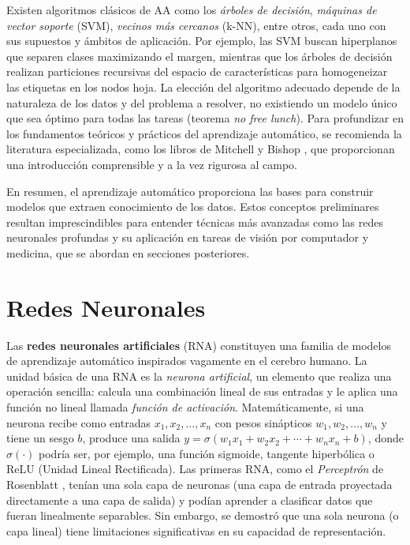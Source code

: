 \documentclass[11pt,spanish,listoffigures,listoftables]{tfgetsinf}
\begin{document}
Existen algoritmos clásicos de AA como los \textit{árboles de decisión}, \textit{máquinas de vector soporte} (SVM), \textit{vecinos más cercanos} (k-NN), entre otros,
cada uno con sus supuestos y ámbitos de aplicación. Por ejemplo, las SVM buscan hiperplanos que separen clases maximizando el margen, mientras que los árboles de 
decisión realizan particiones recursivas del espacio de características para homogeneizar las etiquetas en los nodos hoja. La elección del algoritmo adecuado depende 
de la naturaleza de los datos y del problema a resolver, no existiendo un modelo único que sea óptimo para todas las tareas (teorema \textit{no free lunch}). Para 
profundizar en los fundamentos teóricos y prácticos del aprendizaje automático, se recomienda la literatura especializada, como los libros de Mitchell \cite{Mitchell1997} 
y Bishop \cite{Bishop2006}, que proporcionan una introducción comprensible y a la vez rigurosa al campo.

En resumen, el aprendizaje automático proporciona las bases para construir modelos que extraen conocimiento de los datos. Estos conceptos preliminares resultan 
imprescindibles para entender técnicas más avanzadas como las redes neuronales profundas y su aplicación en tareas de visión por computador y medicina, que se 
abordan en secciones posteriores.

\section{Redes Neuronales}\label{sec:nn} 

Las \textbf{redes neuronales artificiales} (RNA) constituyen una familia de modelos de aprendizaje automático inspirados vagamente en el cerebro humano. 
La unidad básica de una RNA es la \textit{neurona artificial}, un elemento que realiza una operación sencilla: calcula una combinación lineal de sus entradas y 
le aplica una función no lineal llamada \textit{función de activación}. Matemáticamente, si una neurona recibe como entradas $x_1, x_2, \dots, x_n$ con pesos 
sinápticos $w_1, w_2, \dots, w_n$ y tiene un sesgo $b$, produce una salida $y = \sigma(w_1 x_1 + w_2 x_2 + \cdots + w_n x_n + b)$, donde $\sigma(\cdot)$ podría ser, 
por ejemplo, una función sigmoide, tangente hiperbólica o ReLU (Unidad Lineal Rectificada). Las primeras RNA, como el \textit{Perceptrón} de Rosenblatt \cite{Rosenblatt1958},  tenían una 
sola capa de neuronas (una capa de entrada proyectada directamente a una capa de salida) y podían aprender a clasificar datos que fueran linealmente separables. 
Sin embargo, se demostró que una sola neurona (o capa lineal) tiene limitaciones significativas en su capacidad de representación.
\end{document}
